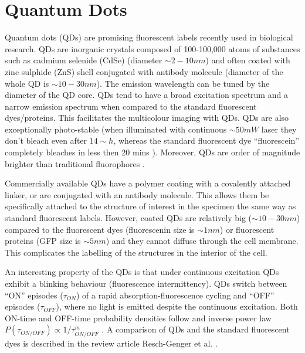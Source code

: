 \section{Quantum Dots\label{sec:Quantum-dots}}

Quantum dots (QDs) are promising fluorescent labels recently used in biological research.  QDs are inorganic crystals composed of 100-100,000 atoms of substances such as cadmium selenide (CdSe)  (diameter $\sim2-10\unit{nm}$) \cite{Alivisatos1996} and often coated with zinc sulphide (ZnS) shell conjugated with antibody molecule (diameter of the whole QD is $\sim10-30\unit{nm}$). The emission wavelength can be tuned by the diameter of the QD core. QDs tend to have a broad excitation spectrum and a narrow emission spectrum when compared to the standard fluorescent dyes/proteins. This facilitates the multicolour imaging with QDs. QDs are also exceptionally photo-stable (when illuminated with continuous $\sim 50\unit{mW}$ laser they don't bleach even after $14\sim\unit{h}$, whereas the standard fluorescent dye ``fluorescein'' completely bleaches in less then 20 mins \cite{Jaiswal2004}). Moreover, QDs are order of magnitude brighter than traditional fluorophores \cite{Resch-Genger2008,Walling2009}. 

Commercially available QDs have a polymer coating with a covalently attached linker, or are conjugated with an antibody molecule. This allows them be specifically attached to the structure of interest in the specimen the same way as standard fluorescent labels. However, coated QDs are relatively big ($\sim10-30\unit{nm}$) compared to the fluorescent dyes (fluorescenin size is $\sim1\unit{nm}$) or fluorescent proteins (GFP size is $\sim5\unit{nm}$) and they cannot diffuse through the cell membrane. This complicates the labelling of the structures in the interior of the cell. 

An interesting property of the QDs is that under continuous excitation QDs exhibit a blinking behaviour (fluorescence intermittency). QDs switch between ``ON'' episodes ($\tau_{ON}$) of a rapid absorption-fluorescence cycling and ``OFF'' episodes ($\tau_{OFF}$), where no light is emitted despite the continuous excitation. Both ON-time and OFF-time probability densities follow and inverse power law $P(\tau_{ON/OFF})\propto1/\tau_{ON/OFF}^{m}$ \cite{Kuno2001, Stefani2009}. A comparison of QDs and the standard fluorescent dyes is described in the review article Resch-Genger et al. \cite{Resch-Genger2008}.


